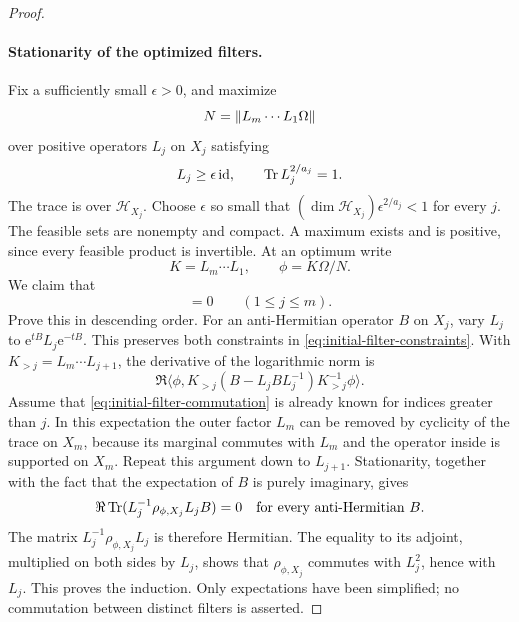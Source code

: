 \begin{proof}
\paragraph{Stationarity of the optimized filters.}
Fix a sufficiently small $\epsilon>0$, and maximize
\[
 N=\lVert L_m\cdots L_1\Omega\rVert
\]
over positive operators $L_j$ on $X_j$ satisfying
\begin{equation}
 L_j\ge\epsilon\operatorname{id},
 \qquad \operatorname{Tr} L_j^{2/a_j}=1.
 \label{eq:initial-filter-constraints}
\end{equation}
The trace is over $\mathcal H_{X_j}$.  Choose $\epsilon$ so small that
$(\dim\mathcal H_{X_j})\epsilon^{2/a_j}<1$ for every $j$.
The feasible sets are nonempty and compact.  A maximum exists and is
positive, since every feasible product is invertible.  At an optimum
write
\[
 K=L_m\cdots L_1,\qquad \phi=K\Omega/N.
\]
We claim that
\begin{equation}
 [L_j,\rho_{\phi,X_j}]=0\qquad(1\le j\le m).
 \label{eq:initial-filter-commutation}
\end{equation}
Prove this in descending order.  For an anti-Hermitian operator $B$ on
$X_j$, vary $L_j$ to $\mathrm e^{tB}L_j\mathrm e^{-tB}$.
This preserves both constraints in
\eqref{eq:initial-filter-constraints}.  With
$K_{>j}=L_m\cdots L_{j+1}$, the derivative of the logarithmic norm is
\[
 \Re\langle\phi,
 K_{>j}(B-L_jBL_j^{-1})K_{>j}^{-1}\phi\rangle.
\]
Assume that \eqref{eq:initial-filter-commutation} is already known for
indices greater than $j$.  In this expectation the outer factor $L_m$
can be removed by cyclicity of the trace on $X_m$, because its marginal
commutes with $L_m$ and the operator inside is supported on $X_m$.
Repeat this argument down to $L_{j+1}$.  Stationarity, together with
the fact that the expectation of $B$ is purely imaginary, gives
\[
 \Re\operatorname{Tr}(L_j^{-1}\rho_{\phi,X_j}L_jB)=0
 \quad\text{for every anti-Hermitian }B.
\]
The matrix $L_j^{-1}\rho_{\phi,X_j}L_j$ is therefore Hermitian.
The equality to its adjoint, multiplied on both sides by $L_j$,
shows that $\rho_{\phi,X_j}$ commutes with $L_j^2$, hence with
$L_j$.  This proves the induction.  Only expectations have been
simplified; no commutation between distinct filters is asserted.


\end{proof}
